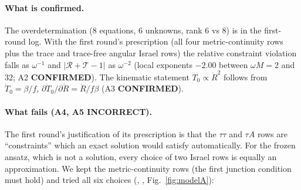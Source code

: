 \documentclass[11pt,a4paper]{article}
\newcommand{\OK}{\textcolor{green!50!black}{\textbf{CONFIRMED}}}
\newcommand{\NO}{\textcolor{red!75!black}{\textbf{INCORRECT}}}
\newcommand{\file}[1]{{\small\path{#1}}}
\begin{document}
\paragraph{What is confirmed.} The overdetermination (8 equations, 6 unknowns, rank 6 vs 8) is in the first-round
log. With the first round's prescription (all four metric-continuity rows plus the trace and trace-free angular
Israel rows) the relative constraint violation falls as $\omega^{-1}$ and $|\mathcal R+\mathcal T-1|$ as $\omega^{-2}$
(local exponents $-2.00$ between $\omega M=2$ and $32$; A2 \OK). The kinematic statement $\dddot T_0\propto\ddot R^2$
follows from $\dot T_0=\beta/f$, $\partial\dot T_0/\partial\dot R=\dot R/f\beta$ (A3 \OK).

\paragraph{What fails (A4, A5 \NO).} The first round's justification of its prescription is that the $\tau\tau$
and $\tau A$ rows are ``constraints'' which an exact solution would satisfy automatically. For the frozen ansatz,
which is not a solution, every choice of two Israel rows is equally an approximation. We kept the metric-continuity
rows (the first junction condition must hold) and tried all six choices (\file{c06d}, \file{c06e},
Fig.~\ref{fig:modelA}):
\begin{center}\small
{}\end{center}
\end{document}
